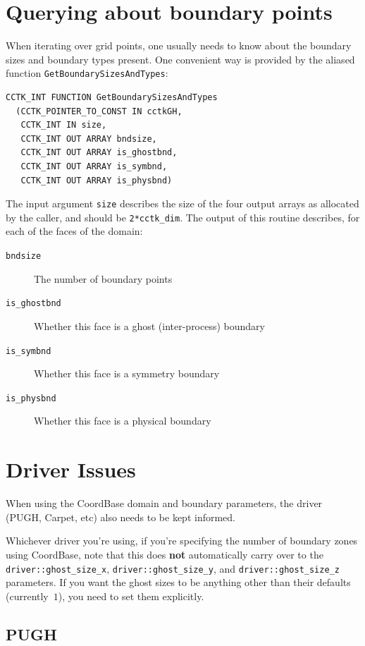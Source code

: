 \section{Querying about boundary points}
\label{CactusBase:CoordBase:boundary-query}

When iterating over grid points, one usually needs to know about the
boundary sizes and boundary types present. One convenient way is
provided by the aliased function \texttt{GetBoundarySizesAndTypes}:
\begin{verbatim}
CCTK_INT FUNCTION GetBoundarySizesAndTypes
  (CCTK_POINTER_TO_CONST IN cctkGH,
   CCTK_INT IN size,
   CCTK_INT OUT ARRAY bndsize,
   CCTK_INT OUT ARRAY is_ghostbnd,
   CCTK_INT OUT ARRAY is_symbnd,
   CCTK_INT OUT ARRAY is_physbnd)
\end{verbatim}
The input argument \texttt{size} describes the size of the four output
arrays as allocated by the caller, and should be \texttt{2*cctk\_dim}.
The output of this routine describes, for each of the faces of the
domain:
\begin{description}
\item[\texttt{bndsize}] The number of boundary points
\item[\texttt{is\_ghostbnd}] Whether this face is a ghost
  (inter-process) boundary
\item[\texttt{is\_symbnd}] Whether this face is a symmetry boundary
\item[\texttt{is\_physbnd}] Whether this face is a physical boundary
\end{description}

\section{Driver Issues}

When using the CoordBase domain and boundary parameters, the driver
(PUGH, Carpet, etc) also needs to be kept informed.

Whichever driver you're using, if you're specifying the number of boundary
zones using CoordBase, note that this does \textbf{not} automatically
carry over to the \verb|driver::ghost_size_x|, \verb|driver::ghost_size_y|,
and \verb|driver::ghost_size_z| parameters.  If you want the ghost sizes
to be anything other than their defaults (currently~$1$), you need to set
them explicitly.

\subsection{PUGH}

